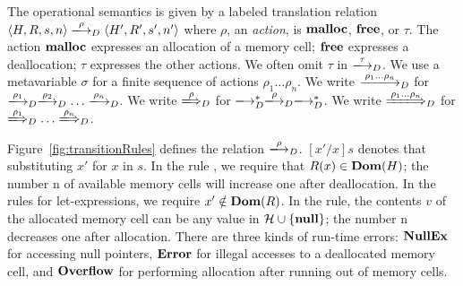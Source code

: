The operational semantics is given by a labeled translation relation
\(\langle H, R, s, n \rangle \xlongrightarrow{\rho}_D \langle H', R',
s', n' \rangle\) where \(\rho\), an \emph{action}, is \(\mathbf{malloc}\),
\(\mathbf{free}\), or \(\tau\).  The action \(\mathbf{malloc}\) expresses an
allocation of a memory cell; \(\mathbf{free}\) expresses a deallocation;
\(\tau\) expresses the other actions.  We often omit \(\tau\) in
\(\xlongrightarrow{\tau}_D\).  We use a metavariable \(\sigma\) for a
finite sequence of actions \(\rho_1\dots\rho_n\).  We write
\(\xlongrightarrow{\rho_1\dots\rho_n}_D\) for
\(\xlongrightarrow{\rho_1}_D\xlongrightarrow{\rho_2}_D\dots\xlongrightarrow{\rho_n}_D\).
We write \(\xLongrightarrow{\rho}_D\) for
\(\xlongrightarrow{}_D^*\xlongrightarrow{\rho}_D\xlongrightarrow{}_D^*\).
We write \(\xLongrightarrow{\rho_1\dots\rho_n}_D\) for
\(\xLongrightarrow{\rho_1}_D\dots\xLongrightarrow{\rho_n}_D\).


Figure~\ref{fig:transitionRules} defines the relation
\(\xlongrightarrow{\rho}_D\). \([x'/x]s\) denotes that substituting \(x'\) for \(x\) in \(s\). In the rule , we require that \(R(x) \in \mathbf{Dom}(H)\); the number n of available memory cells will increase one after deallocation. In the rules for let-expressions, we require \(x' \notin \mathbf{Dom}(R)\). In the  rule, the contents \(v\) of the allocated memory cell can be any value in \(\mathcal{H} \cup \{\mathbf{null}\}\); the number n decreases one after allocation. There are three kinds of run-time errors: \(\bf NullEx\) for accessing null pointers, \(\bf Error\) for illegal accesses to a deallocated memory cell, and \(\bf Overflow\) for performing allocation after running out of memory cells.


